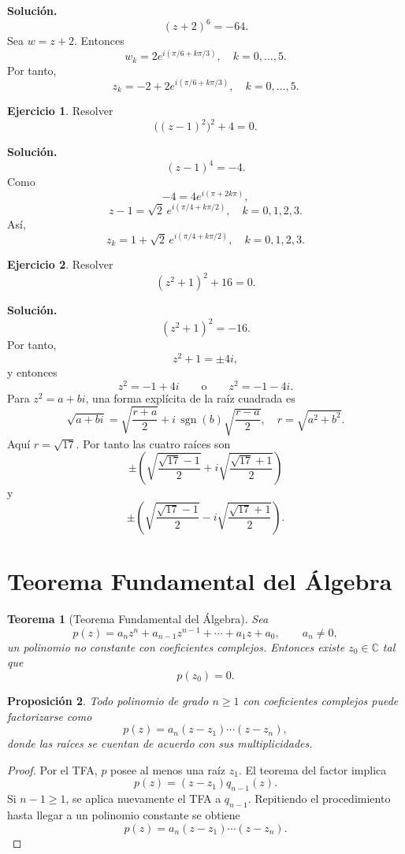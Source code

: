 \documentclass[12pt]{article}
\newtheorem{teorema}{Teorema}[section]
\newtheorem{proposicion}[teorema]{Proposición}
\theoremstyle{definition}
\newtheorem{ejercicio}{Ejercicio}[section]
\theoremstyle{remark}
\newcommand{\C}{\mathbb{C}}
\begin{document}
\textbf{Solución.}
\[
(z+2)^6=-64.
\]
Sea $w=z+2$. Entonces
\[
w_k=2e^{i(\pi/6+k\pi/3)},\quad k=0,\ldots,5.
\]
Por tanto,
\[
\boxed{
z_k=-2+2e^{i(\pi/6+k\pi/3)},\quad k=0,\ldots,5.
}
\]

\begin{ejercicio}
Resolver
\[
\bigl((z-1)^2\bigr)^2+4=0.
\]
\end{ejercicio}

\textbf{Solución.}
\[
(z-1)^4=-4.
\]
Como
\[
-4=4e^{i(\pi+2k\pi)},
\]
\[
z-1=\sqrt2\,e^{i(\pi/4+k\pi/2)},\quad k=0,1,2,3.
\]
Así,
\[
\boxed{
z_k=1+\sqrt2\,e^{i(\pi/4+k\pi/2)},\quad k=0,1,2,3.
}
\]

\begin{ejercicio}
Resolver
\[
(z^2+1)^2+16=0.
\]
\end{ejercicio}

\textbf{Solución.}
\[
(z^2+1)^2=-16.
\]
Por tanto,
\[
z^2+1=\pm4i,
\]
y entonces
\[
z^2=-1+4i
\qquad\text{o}\qquad
z^2=-1-4i.
\]
Para $z^2=a+bi$, una forma explícita de la raíz cuadrada es
\[
\sqrt{a+bi}
=
\sqrt{\frac{r+a}{2}}
+i\,\operatorname{sgn}(b)
\sqrt{\frac{r-a}{2}},
\quad r=\sqrt{a^2+b^2}.
\]
Aquí $r=\sqrt{17}$. Por tanto las cuatro raíces son
\[
\boxed{
\pm\left(
\sqrt{\frac{\sqrt{17}-1}{2}}
+i\sqrt{\frac{\sqrt{17}+1}{2}}
\right)
}
\]
y
\[
\boxed{
\pm\left(
\sqrt{\frac{\sqrt{17}-1}{2}}
-i\sqrt{\frac{\sqrt{17}+1}{2}}
\right).
}
\]

\section{Teorema Fundamental del Álgebra}

\begin{teorema}[Teorema Fundamental del Álgebra]
Sea
\[
p(z)=a_nz^n+a_{n-1}z^{n-1}+\cdots+a_1z+a_0,
\qquad a_n\neq0,
\]
un polinomio no constante con coeficientes complejos. Entonces existe
$z_0\in\C$ tal que
\[
p(z_0)=0.
\]
\end{teorema}

\begin{proposicion}
Todo polinomio de grado $n\ge1$ con coeficientes complejos puede factorizarse
como
\[
\boxed{p(z)=a_n(z-z_1)\cdots(z-z_n),}
\]
donde las raíces se cuentan de acuerdo con sus multiplicidades.
\end{proposicion}

\begin{proof}
Por el TFA, $p$ posee al menos una raíz $z_1$. El teorema del factor implica
\[
p(z)=(z-z_1)q_{n-1}(z).
\]
Si $n-1\ge1$, se aplica nuevamente el TFA a $q_{n-1}$. Repitiendo el
procedimiento hasta llegar a un polinomio constante se obtiene
\[
p(z)=a_n(z-z_1)\cdots(z-z_n).
\]
\end{proof}
\end{document}
